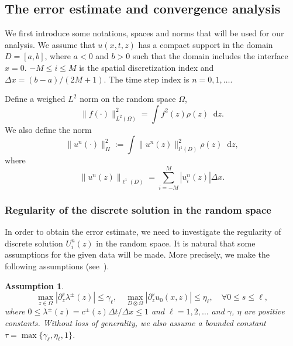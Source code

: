 \documentclass[12pt]{article}
\theoremstyle{plain}
\newtheorem{assump}{\bf{Assumption}}[section]
\theoremstyle{remark}
\theoremstyle{remark}
\theoremstyle{remark}
\numberwithin{equation}{section}
\newcommand*\diff{\mathop{}\!\mathrm{d}}
\newcommand{\dnz}[1]{\partial^{#1}_z}
\newcommand{\Dx}{\Delta x}
\newcommand{\Dt}{\Delta t}
\newcommand{\Uniz}{U^n_i(z)}
\begin{document}
\subsection{The  error estimate and convergence analysis}


We first introduce some notations, spaces and norms that will be used for
our analysis. We assume that $u(x,t,z)$ has a compact support in the domain $D = [a, b]$, where $a < 0$ and $b > 0$ such that the domain includes the interface $x = 0$. $-M\leq i\leq M$ is the spatial discretization index and $\Dx = (b - a)/(2M+1)$. The time step index is $n = 0, 1, \dotsc$. 

Define a weighed $L^2$ norm on the random space $\Omega$,
\begin{equation}
  \|f(\cdot)\|^2_{L^2(\Omega)} = \int f^2(z)\rho(z)\diff z.
\end{equation}
We also define the norm
\begin{equation}
  \|u^n(\cdot)\|_H^2 := \int\|u^n(z)\|_{l^1(D)}^2\rho(z)\diff z,
\end{equation}
where 
\begin{equation}
  \|u^n(z)\|_{\ell^1(D)} = \sum_{i=-M}^M|u^n_i(z)|\Dx.
\end{equation}


\subsubsection{Regularity of the discrete solution in the random space}

In order to obtain the error estimate, we need to investigate the regularity of discrete solution
$\Uniz$ in the random space. It is natural that some assumptions for the given data will be made. More precisely, we make the following assumptions (see~\cite{Tang:2012ibba,Zhou:2010gwba}).
\begin{assump}
  \begin{equation}\label{assu}
    \underset{z\in\Omega}{\max}|\dnz{s} \lambda^{\pm}(z)|\leq\gamma_\ell, \quad\underset{D\otimes\Omega}{\max}|\dnz{s} u_0(x,z)|\leq \eta_\ell, \quad \forall 0\leq s\leq\ell,
  \end{equation}
  where $0\leq\lambda^{\pm}(z)=c^{\pm}(z)\Dt/\Dx\leq 1$ and $\ell = 1, 2, \dotsc$ and $\gamma$, $\eta$ are positive constants. Without loss of generality, we also assume a bounded constant $\tau = \max\big\{\gamma_\ell, \eta_\ell, 1\big\}$.
\end{assump}
\end{document}
